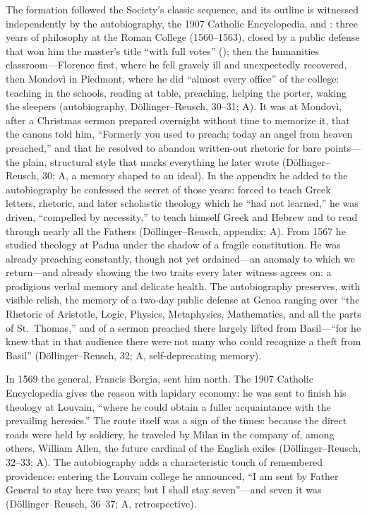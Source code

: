 The formation followed the Society's classic sequence, and its
outline is witnessed independently by the autobiography, the 1907
Catholic Encyclopedia, and : three years of philosophy
at the Roman College (1560--1563), closed by a public defense that
won him the master's title ``with full votes'' ();
then the humanities classroom---Florence first, where he fell
gravely ill and unexpectedly recovered, then Mondov\`i in Piedmont,
where he did ``almost every office'' of the college: teaching in the
schools, reading at table, preaching, helping the porter, waking the
sleepers (autobiography, D\"ollinger--Reusch, 30--31; A). It was at
Mondov\`i, after a Christmas sermon prepared overnight without time
to memorize it, that the canons told him, ``Formerly you used to
preach; today an angel from heaven preached,'' and that he resolved
to abandon written-out rhetoric for bare points---the plain,
structural style that marks everything he later wrote
(D\"ollinger--Reusch, 30; A, a memory shaped to an ideal). In the
appendix he added to the autobiography he confessed the secret of
those years: forced to teach Greek letters, rhetoric, and later
scholastic theology which he ``had not learned,'' he was driven,
``compelled by necessity,'' to teach himself Greek and Hebrew and to
read through nearly all the Fathers (D\"ollinger--Reusch, appendix;
A). From 1567 he studied theology at Padua under the shadow of a
fragile constitution. He was already preaching constantly, though
not yet ordained---an anomaly to which we return---and already
showing the two traits every later witness agrees on: a prodigious
verbal memory and delicate health. The autobiography preserves, with
visible relish, the memory of a two-day public defense at Genoa
ranging over ``the Rhetoric of Aristotle, Logic, Physics,
Metaphysics, Mathematics, and all the parts of St.~Thomas,'' and of
a sermon preached there largely lifted from Basil---``for he knew
that in that audience there were not many who could recognize a
theft from Basil'' (D\"ollinger--Reusch, 32; A, self-deprecating
memory).

In 1569 the general, Francis Borgia, sent him north. The 1907
Catholic Encyclopedia gives the reason with lapidary economy: he was
sent to finish his theology at Louvain, ``where he could obtain a
fuller acquaintance with the prevailing heresies.'' The route itself
was a sign of the times: because the direct roads were held by
soldiery, he traveled by Milan in the company of, among others,
William Allen, the future cardinal of the English exiles
(D\"ollinger--Reusch, 32--33; A). The autobiography adds a
characteristic touch of remembered providence: entering the Louvain
college he announced, ``I am sent by Father General to stay here two
years; but I shall stay seven''---and seven it was
(D\"ollinger--Reusch, 36--37; A, retrospective).
